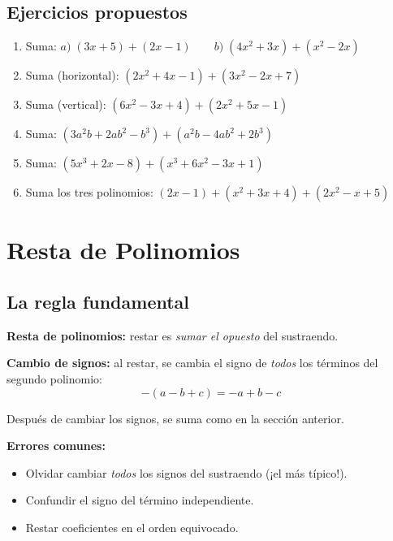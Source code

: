 \documentclass[12pt, letterpaper]{article}
\begin{document}
\subsection{Ejercicios propuestos}

\begin{enumerate}[leftmargin=*, resume]
  \item \facil{} Suma: $a) \; (3x + 5) + (2x - 1) \qquad b) \; (4x^2 + 3x) + (x^2 - 2x)$

  \item \facil{} Suma (horizontal): $(2x^2 + 4x - 1) + (3x^2 - 2x + 7)$

  \item \facil{} Suma (vertical): $(6x^2 - 3x + 4) + (2x^2 + 5x - 1)$

  \item \medio{} Suma: $(3a^2b + 2ab^2 - b^3) + (a^2b - 4ab^2 + 2b^3)$

  \item \medio{} Suma: $(5x^3 + 2x - 8) + (x^3 + 6x^2 - 3x + 1)$

  \item \medio{} Suma los tres polinomios: $(2x - 1) + (x^2 + 3x + 4) + (2x^2 - x + 5)$
\end{enumerate}


\section{Resta de Polinomios}

\subsection{La regla fundamental}

\begin{cuadroteoria}
  \textbf{Resta de polinomios:} restar es \emph{sumar el opuesto} del sustraendo.

  \textbf{Cambio de signos:} al restar, se cambia el signo de \emph{todos} los términos del segundo polinomio:
  $$-(a - b + c) = -a + b - c$$

  Después de cambiar los signos, se suma como en la sección anterior.
\end{cuadroteoria}

\begin{cuadroadvertencia}
  \textbf{Errores comunes:}
  \begin{itemize}[leftmargin=*]
    \item Olvidar cambiar \emph{todos} los signos del sustraendo (¡el más típico!).
    \item Confundir el signo del término independiente.
    \item Restar coeficientes en el orden equivocado.
  \end{itemize}
\end{cuadroadvertencia}
\newpage
\end{document}
